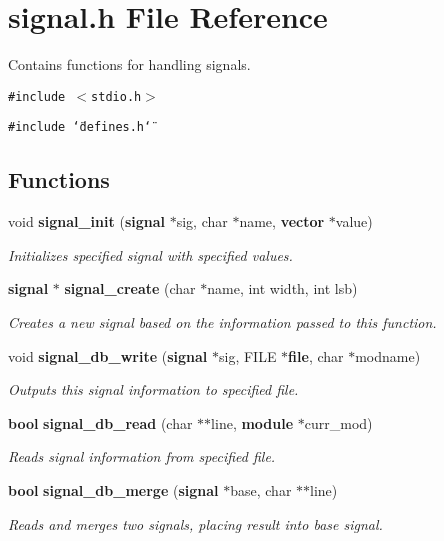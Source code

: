 \section{signal.h File Reference}
\label{signal_8h}
Contains functions for handling signals. 


{\tt \#include $<$stdio.h$>$}\par
{\tt \#include \char`\"{}defines.h\char`\"{}}\par
\subsection*{Functions}
\begin{CompactItemize}
\item 
void {\bf signal\_\-init} ({\bf signal} $\ast$sig, char $\ast$name, {\bf vector} $\ast$value)
\begin{CompactList}\small\item\em Initializes specified signal with specified values.\item\end{CompactList}\item 
{\bf signal} $\ast$ {\bf signal\_\-create} (char $\ast$name, int width, int lsb)
\begin{CompactList}\small\item\em Creates a new signal based on the information passed to this function.\item\end{CompactList}\item 
void {\bf signal\_\-db\_\-write} ({\bf signal} $\ast$sig, FILE $\ast${\bf file}, char $\ast$modname)
\begin{CompactList}\small\item\em Outputs this signal information to specified file.\item\end{CompactList}\item 
{\bf bool} {\bf signal\_\-db\_\-read} (char $\ast$$\ast$line, {\bf module} $\ast$curr\_\-mod)
\begin{CompactList}\small\item\em Reads signal information from specified file.\item\end{CompactList}\item 
{\bf bool} {\bf signal\_\-db\_\-merge} ({\bf signal} $\ast$base, char $\ast$$\ast$line)
\begin{CompactList}\small\item\em Reads and merges two signals, placing result into base signal.\item\end{CompactList}\item 

\end{CompactItemize}
